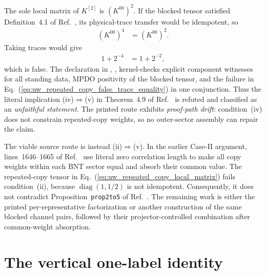 \documentclass{article}
\begin{document}
The sole local matrix of $K^{[2]}$ is $(K^{00})^2$. If the blocked tensor
satisfied Definition~4.1 of Ref.~\cite{Cirac2016MPDO_arXiv}, its
physical-trace transfer would be idempotent, so
\begin{align}
    (K^{00})^4
    &=(K^{00})^2.
    \label{eq:uw_repeated_copy_required_idempotence}
\end{align}
Taking traces would give
\begin{align}
    1+2^{-4}
    &=1+2^{-2},
    \label{eq:uw_repeated_copy_false_trace_equality}
\end{align}
which is false. The declaration in
,
, kernel-checks explicit component witnesses
for all standing data, MPDO positivity of the blocked tensor, and the failure
in Eq.~(\ref{eq:uw_repeated_copy_false_trace_equality}) in one conjunction.
Thus the literal implication (iv)$\Rightarrow$(v) in Theorem~4.9 of
Ref.~\cite{Cirac2016MPDO_arXiv} is refuted and classified as an
\emph{unfaithful statement}. The printed route exhibits \emph{proof-path
drift}: condition~(iv) does not constrain repeated-copy weights, so no
outer-sector assembly can repair the claim.

The viable source route is instead (ii)$\Rightarrow$(v). In the earlier
Case-II argument, lines~1646--1665 of Ref.~\cite{Cirac2016MPDO_arXiv} use
literal zero correlation length to make all copy weights within each BNT
sector equal and absorb their common value. The repeated-copy tensor in
Eq.~(\ref{eq:uw_repeated_copy_local_matrix}) fails condition~(ii), because
$\operatorname{diag}(1,1/2)$ is not idempotent. Consequently, it does not
contradict Proposition~\texttt{prop2to5} of
Ref.~\cite{Cirac2016MPDO_arXiv}. The remaining work is either the printed
per-representative factorization or another construction of the same blocked
channel pairs, followed by their projector-controlled combination after
common-weight absorption.

\section{The vertical one-label identity}
\end{document}

